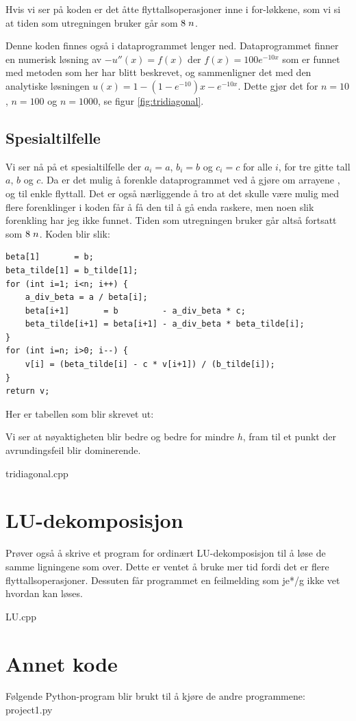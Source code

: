 \documentclass[a4paper,10pt,english]{article}
\begin{document}
Hvis vi ser på koden er det åtte flyttallsoperasjoner inne i for-løkkene, som vi si at tiden som utregningen bruker går som $8\hspace{0.1cm}n$.

Denne koden finnes også i dataprogrammet  lenger ned. Dataprogrammet finner en numerisk løsning av $-u''(x)=f(x)$ der $f(x)=100 e^{-10x}$ som er funnet med metoden som her har blitt beskrevet, og sammenligner det med den analytiske løsningen $u(x)=1-(1-e^{-10}) x-e^{-10x}$. Dette gjør det for $n=10$, $n=100$ og $n=1000$, se figur \ref{fig:tridiagonal}.

\subsection*{Spesialtilfelle}
Vi ser nå på et spesialtilfelle der $a_i=a$, $b_i=b$ og $c_i=c$ for alle $i$, for tre gitte tall $a$, $b$ og $c$. Da er det mulig å forenkle dataprogrammet ved å gjøre om arrayene ,  og  til enkle flyttall. Det er også nærliggende å tro at det skulle være mulig med flere forenklinger i koden får å få den til å gå enda raskere, men noen slik forenkling har jeg ikke funnet. Tiden som utregningen bruker går altså fortsatt som $8\hspace{0.1cm}n$. Koden blir slik:

\begin{lstlisting}
beta[1]       = b;
beta_tilde[1] = b_tilde[1];
for (int i=1; i<n; i++) {
	a_div_beta = a / beta[i];
	beta[i+1]       = b         - a_div_beta * c;
	beta_tilde[i+1] = beta[i+1] - a_div_beta * beta_tilde[i];
}
for (int i=n; i>0; i--) {
	v[i] = (beta_tilde[i] - c * v[i+1]) / (b_tilde[i]);
}
return v;
\end{lstlisting}

Her er tabellen som blir skrevet ut:



Vi ser at nøyaktigheten blir bedre og bedre for mindre $h$, fram til et punkt der avrundingsfeil blir dominerende.

tridiagonal.cpp

\section*{LU-dekomposisjon}
Prøver også å skrive et program for ordinært LU-dekomposisjon til å løse de samme ligningene som over. Dette er ventet å bruke mer tid fordi det er flere flyttallsoperasjoner. Dessuten får programmet en feilmelding som je*/g ikke vet hvordan kan løses.

LU.cpp

\section*{Annet kode}
Følgende Python-program blir brukt til å kjøre de andre programmene:
project1.py

\end{document}
